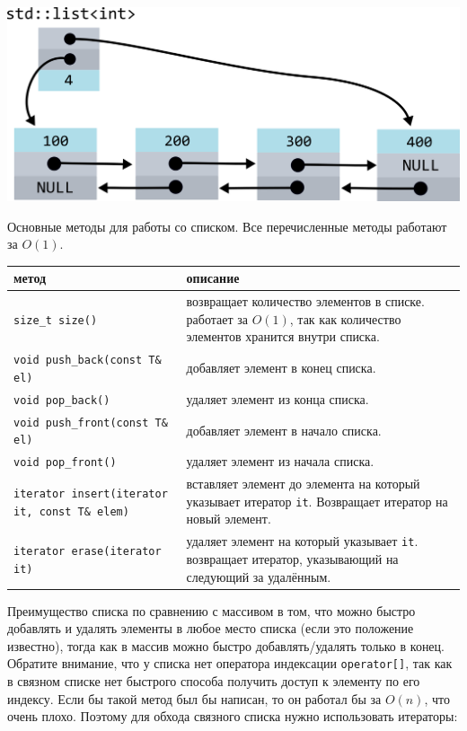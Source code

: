 \documentclass{article}
\begin{document}
\begin{center}
\includegraphics[scale=0.8]{../images/list_internals.png}
\end{center}

 Основные методы для работы со списком. Все перечисленные методы работают за $O(1)$.

\bgroup
\def\arraystretch{2}%
\begin{tabular}{ l | p{8cm} }
метод & описание \\ \hline
\texttt{size\_t size()} & возвращает количество элементов в списке. \newline
                          работает за $O(1)$, так как количество элементов хранится внутри списка.
\\ \hline

\texttt{void push\_back(const T\& el)} & добавляет элемент в конец списка.
\\ \hline
\texttt{void pop\_back()} & удаляет элемент из конца списка.
\\ \hline
\texttt{void push\_front(const T\& el)} & добавляет элемент в начало списка.
\\ \hline
\texttt{void pop\_front()} & удаляет элемент из начала списка.
\\ \hline

\texttt{iterator insert(iterator it, const T\& elem)} & вставляет элемент до элемента на который указывает итератор \texttt{it}. Возвращает итератор на новый элемент.
\\ \hline

\texttt{iterator erase(iterator it)} & удаляет элемент на который указывает \texttt{it}. \newline
                                       возвращает итератор, указывающий на следующий за удалённым. \newline
\\
\end{tabular}
\egroup

Преимущество списка по сравнению с массивом в том, что можно быстро добавлять и удалять элементы в любое место списка (если это положение известно), тогда как в массив можно быстро добавлять/удалять только в конец.
Обратите внимание, что у списка нет оператора индексации \texttt{operator[]},
так как в связном списке нет быстрого способа получить доступ к элементу по его индексу.
Если бы такой метод был бы написан, то он работал бы за $O(n)$, что очень плохо.
Поэтому для обхода связного списка нужно использовать итераторы:
\end{document}
